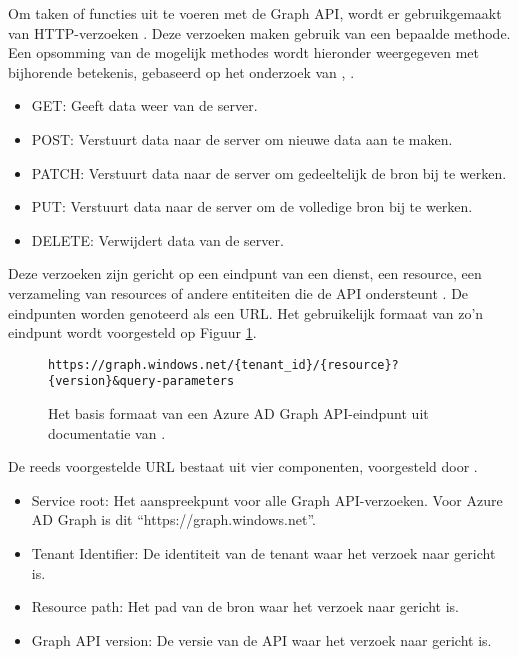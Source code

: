 
Om taken of functies uit te voeren met de Graph \ac{API}, wordt er gebruikgemaakt van \ac{HTTP}-verzoeken \autocite{Microsoft2015}. Deze verzoeken maken gebruik van een bepaalde methode. Een opsomming van de mogelijk methodes wordt hieronder weergegeven met bijhorende betekenis, gebaseerd op het onderzoek van \textcite{Fielding1999}, \textcite{Dusseault2010}.

\begin{itemize}
    \item GET: Geeft data weer van de server.
    \item POST: Verstuurt data naar de server om nieuwe data aan te maken.
    \item PATCH: Verstuurt data naar de server om gedeeltelijk de bron bij te werken.
    \item PUT: Verstuurt data naar de server om de volledige bron bij te werken.
    \item DELETE: Verwijdert data van de server.
\end{itemize}

Deze verzoeken zijn gericht op een eindpunt van een dienst, een resource, een verzameling van resources of andere entiteiten die de \ac{API} ondersteunt \autocite{Microsoft2015}. De eindpunten worden genoteerd als een \ac{URL}. Het gebruikelijk formaat van zo'n eindpunt wordt voorgesteld op Figuur \ref{bfe}. \\

\begin{figure}[h]
    \scriptsize\begin{verbatim}https://graph.windows.net/{tenant_id}/{resource}?{version}&query-parameters
    \end{verbatim}    
    \caption[Basis formaat Graph API-eindpunt]{Het basis formaat van een Azure \ac{AD} Graph \ac{API}-eindpunt uit documentatie van \textcite{Microsoft2023o}.}
    \label{bfe}
\end{figure}

De reeds voorgestelde \ac{URL} bestaat uit vier componenten, voorgesteld door \textcite{Microsoft2015}.

\begin{itemize}
    \item Service root: Het aanspreekpunt voor alle Graph \ac{API}-verzoeken. Voor Azure \ac{AD} Graph is dit “https://graph.windows.net”.
    \item Tenant Identifier: De identiteit van de tenant waar het verzoek naar gericht is.
    \item Resource path: Het pad van de bron waar het verzoek naar gericht is.
    \item Graph \ac{API} version: De versie van de \ac{API} waar het verzoek naar gericht is.
\end{itemize}

